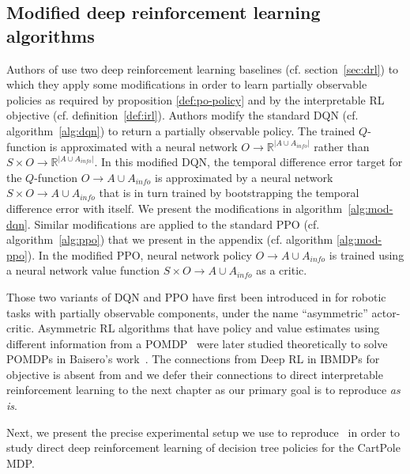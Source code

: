 \subsection{Modified deep reinforcement learning algorithms}
Authors of \cite{topin2021iterative} use two deep reinforcement learning baselines (cf. section~\ref{sec:drl}) to which they apply some modifications in order to learn partially observable policies as required by proposition \ref{def:po-policy} and by the interpretable RL objective (cf. definition~\ref{def:irl}).
Authors modify the standard DQN (cf. algorithm~\ref{alg:dqn}) to return a partially observable policy. The trained $Q$-function is approximated with a neural network $O\rightarrow \mathbb{R}^{|A\cup A_{info}|}$ rather than $S\times O\rightarrow \mathbb{R}^{|A\cup A_{info}|}$.
In this modified DQN, the temporal difference error target for the $Q$-function $O\rightarrow A\cup A_{info}$ is approximated by a neural network $S\times O\rightarrow A\cup A_{info}$ that is in turn trained by bootstrapping the temporal difference error with itself.
We present the modifications in algorithm~\ref{alg:mod-dqn}.
Similar modifications are applied to the standard PPO (cf. algorithm~\ref{alg:ppo}) that we present in the appendix (cf. algorithm \ref{alg:mod-ppo}). In the modified PPO, neural network policy $O\rightarrow A\cup A_{info}$ is trained using a neural network value function $S\times O\rightarrow A\cup A_{info}$ as a critic.

Those two variants of DQN and PPO have first been introduced in \cite{pinto} for robotic tasks with partially observable components, under the name ``asymmetric'' actor-critic. 
Asymmetric RL algorithms that have policy and value estimates using different information from a POMDP~\cite{POMDP,chap2} were later studied theoretically to solve POMDPs in Baisero's work~\cite{baisero-dqn,baisero-ppo}.
The connections from Deep RL in IBMDPs for objective is absent from \cite{topin2021iterative} and we defer their connections to direct interpretable reinforcement learning to the next chapter as our primary goal is to reproduce \cite{topin2021iterative} \textit{as is}.

Next, we present the precise experimental setup we use to reproduce~\cite[table 1]{topin2021iterative} in order to study direct deep reinforcement learning of decision tree policies for the CartPole MDP.

